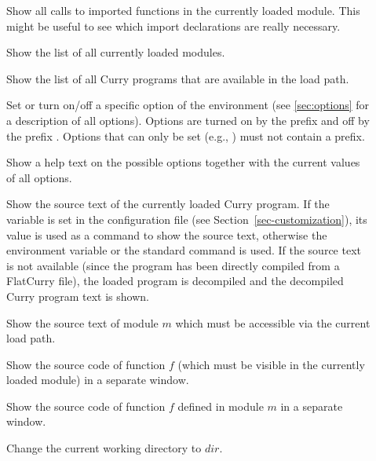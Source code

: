 \begin{description}
\item[]
Show all calls to imported functions in the currently loaded module.
This might be useful to see which import declarations are really necessary.

\item[]
Show the list of all currently loaded modules.

\item[]
Show the list of all Curry programs that are available in the load path.

\item[]
Set or turn on/off a specific option
of the \CYS environment (see \ref{sec:options} for a description
of all options). Options are turned on by the prefix
\ccode{+} and off by the prefix \ccode{-}. Options that can only
be set (e.g., ) must not contain a prefix.

\item[]
Show a help text on the possible options
together with the current values of all options.

\item[]
Show the source text of the currently loaded Curry program.
If the variable  is set in the
configuration file 
(see Section~\ref{sec-customization}),
its value is used as a command to show the source text,
otherwise the environment variable  or the standard command
 is used.
If the source text is not available
(since the program has been directly compiled from a FlatCurry
file), the loaded program is decompiled and
the decompiled Curry program text is shown.

\item[]
Show the source text of module $m$ which must be accessible
via the current load path.

\item[]
Show the source code of function $f$ (which must be visible
in the currently loaded module) in a separate window.

\item[]
Show the source code of function $f$ defined in module $m$
in a separate window.

\item[]
Change the current working directory to $dir$.


\end{description}
